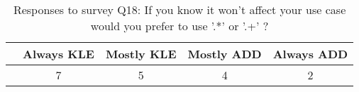 \begin{table}
\caption{Responses to survey Q18: If you know it won't affect your use case would you prefer to use '.*' or '.+' ? \label{table:KLEvsADD}}
\begin{center}
\begin{small}
\begin{tabular}{lc|c|c|c}
\toprule
&\textbf{Always KLE} & \textbf{Mostly KLE} & \textbf{Mostly ADD} & \textbf{Always ADD}\\  \midrule
& 7 & 5 & 4 & 2 \\
\bottomrule
\end{tabular}
\end{small}
\end{center}
\vspace{-12pt}
\end{table}
